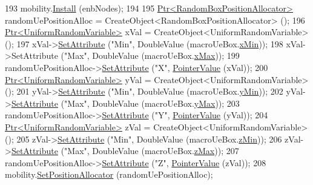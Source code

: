 \begin{DoxyCode}
193   mobility.\hyperlink{classns3_1_1MobilityHelper_a07737960ee95c0777109cf2994dd97ae}{Install} (enbNodes);
194 
195   \hyperlink{classns3_1_1Ptr}{Ptr<RandomBoxPositionAllocator>} randomUePositionAlloc = 
      CreateObject<RandomBoxPositionAllocator> ();
196   \hyperlink{classns3_1_1Ptr}{Ptr<UniformRandomVariable>} xVal = CreateObject<UniformRandomVariable> ();
197   xVal->\hyperlink{classns3_1_1ObjectBase_ac60245d3ea4123bbc9b1d391f1f6592f}{SetAttribute} (\textcolor{stringliteral}{"Min"}, DoubleValue (macroUeBox.\hyperlink{classns3_1_1Box_a1fd6a43d53258323331d34da600ff1c5}{xMin}));
198   xVal->SetAttribute (\textcolor{stringliteral}{"Max"}, DoubleValue (macroUeBox.\hyperlink{classns3_1_1Box_a50021049c756e770329145b25d9533a2}{xMax}));
199   randomUePositionAlloc->\hyperlink{classns3_1_1ObjectBase_ac60245d3ea4123bbc9b1d391f1f6592f}{SetAttribute} (\textcolor{stringliteral}{"X"}, \hyperlink{classns3_1_1PointerValue}{PointerValue} (xVal));
200   \hyperlink{classns3_1_1Ptr}{Ptr<UniformRandomVariable>} yVal = CreateObject<UniformRandomVariable> ();
201   yVal->\hyperlink{classns3_1_1ObjectBase_ac60245d3ea4123bbc9b1d391f1f6592f}{SetAttribute} (\textcolor{stringliteral}{"Min"}, DoubleValue (macroUeBox.\hyperlink{classns3_1_1Box_a3865ed092f941186823539c9979002f8}{yMin}));
202   yVal->\hyperlink{classns3_1_1ObjectBase_ac60245d3ea4123bbc9b1d391f1f6592f}{SetAttribute} (\textcolor{stringliteral}{"Max"}, DoubleValue (macroUeBox.\hyperlink{classns3_1_1Box_a001fd430a14b19efe925c818a332e392}{yMax}));
203   randomUePositionAlloc->\hyperlink{classns3_1_1ObjectBase_ac60245d3ea4123bbc9b1d391f1f6592f}{SetAttribute} (\textcolor{stringliteral}{"Y"}, \hyperlink{classns3_1_1PointerValue}{PointerValue} (yVal));
204   \hyperlink{classns3_1_1Ptr}{Ptr<UniformRandomVariable>} zVal = CreateObject<UniformRandomVariable> ();
205   zVal->\hyperlink{classns3_1_1ObjectBase_ac60245d3ea4123bbc9b1d391f1f6592f}{SetAttribute} (\textcolor{stringliteral}{"Min"}, DoubleValue (macroUeBox.\hyperlink{classns3_1_1Box_a9ab297b877a5c31dbfb344bd6f027e91}{zMin}));
206   zVal->\hyperlink{classns3_1_1ObjectBase_ac60245d3ea4123bbc9b1d391f1f6592f}{SetAttribute} (\textcolor{stringliteral}{"Max"}, DoubleValue (macroUeBox.\hyperlink{classns3_1_1Box_ae4d135764bbc8421fe82ec91e4693b59}{zMax}));
207   randomUePositionAlloc->\hyperlink{classns3_1_1ObjectBase_ac60245d3ea4123bbc9b1d391f1f6592f}{SetAttribute} (\textcolor{stringliteral}{"Z"}, \hyperlink{classns3_1_1PointerValue}{PointerValue} (zVal));
208   mobility.\hyperlink{classns3_1_1MobilityHelper_ac59d5295076be3cc11021566713a28c5}{SetPositionAllocator} (randomUePositionAlloc);

\end{DoxyCode}
